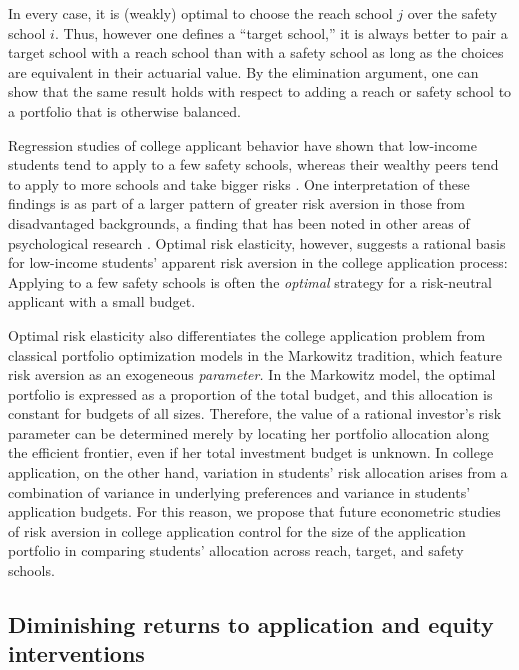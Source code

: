 \noindent In every case, it is (weakly) optimal to choose the reach school $j$ over the safety school $i$. Thus, however one defines a ``target school,'' it is always better to pair a target school with a reach school than with a safety school as long as the choices are equivalent in their actuarial value. By the elimination argument, one can show that the same result holds with respect to adding a reach or safety school to a portfolio that is otherwise balanced.

Regression studies of college applicant behavior have shown that low-income students tend to apply to a few safety schools, whereas their wealthy peers tend to apply to more schools and take bigger risks \cite{hoxbyandavery2012}. One interpretation of these findings is as part of a larger pattern of greater risk aversion in those from disadvantaged backgrounds, a finding that has been noted in other areas of psychological research \cite{hartlaubandschneider2012,wattsetal2018,vanhuizenandalessie2019}. Optimal risk elasticity, however, suggests a rational basis for low-income students' apparent risk aversion in the college application process: Applying to a few safety schools is often the \emph{optimal} strategy for a risk-neutral applicant with a small budget. %

Optimal risk elasticity also differentiates the college application problem from classical portfolio optimization models in the Markowitz \cite{markowitz1952} tradition, which feature risk aversion as an exogeneous \emph{parameter.} In the Markowitz model, the optimal portfolio is expressed as a proportion of the total budget, and this allocation is constant for budgets of all sizes. Therefore, the value of a rational investor's risk parameter can be determined merely by locating her portfolio allocation along the efficient frontier, even if her total investment budget is unknown. In college application, on the other hand, variation in students' risk allocation arises from a combination of variance in underlying preferences and variance in students' application budgets. For this reason, we propose that future econometric studies of risk aversion in college application control for the size of the application portfolio in comparing students' allocation across reach, target, and safety schools. 

\subsection{Diminishing returns to application and equity interventions}


